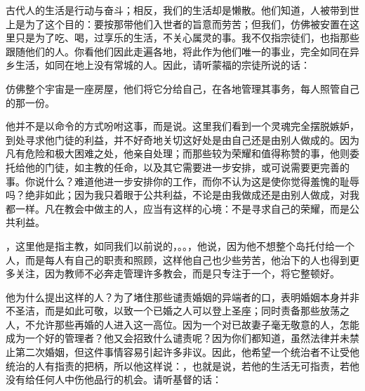 \par

古代人的生活是行动与奋斗；相反，我们的生活却是懒散。他们知道，人被带到世上是为了这个目的：要按那带他们入世者的旨意而劳苦；但我们，仿佛被安置在这里只是为了吃、喝，过享乐的生活，不关心属灵的事。我不仅指宗徒们，也指那些跟随他们的人。你看他们因此走遍各地，将此作为他们唯一的事业，完全如同在异乡生活，如同在地上没有常城的人。因此，请听蒙福的宗徒所说的话：\par

\par

仿佛整个宇宙是一座房屋，他们将它分给自己，在各地管理其事务，每人照管自己的那一份。\par

\par

他并不是以命令的方式吩咐这事，而是说。这里我们看到一个灵魂完全摆脱嫉妒，到处寻求他门徒的利益，并不好奇地关切这好处是由自己还是由别人做成的。因为凡有危险和极大困难之处，他亲自处理；而那些较为荣耀和值得称赞的事，他则委托给他的门徒，如主教的任命，以及其它需要进一步安排，或可说需要更完善的事。你说什么？难道他进一步安排你的工作，而你不认为这是使你觉得羞愧的耻辱吗？绝非如此；因为我只着眼于公共利益，不论是由我做成还是由别人做成，对我都一样。凡在教会中做主的人，应当有这样的心境：不是寻求自己的荣耀，而是公共利益。\par

，这里他是指主教，如同我们以前说的，。。，他说，因为他不想整个岛托付给一个人，而是每人有自己的职责和照顾，这样他自己也少些劳苦，他治下的人也得到更多关注，因为教师不必奔走管理许多教会，而是只专注于一个，将它整顿好。\par

\par

他为什么提出这样的人？为了堵住那些谴责婚姻的异端者的口，表明婚姻本身并非不圣洁，而是如此可敬，以致一个已婚之人可以登上圣座；同时责备那些放荡之人，不允许那些再婚的人进入这一高位。因为一个对已故妻子毫无敬意的人，怎能成为一个好的管理者？他又会招致什么谴责呢？因为你们都知道，虽然法律并未禁止第二次婚姻，但这件事情容易引起许多非议。因此，他希望一个统治者不让受他统治的人有指责的把柄，所以他这样说：，也就是说，若他的生活无可指责，若他没有给任何人中伤他品行的机会。请听基督的话：\par

